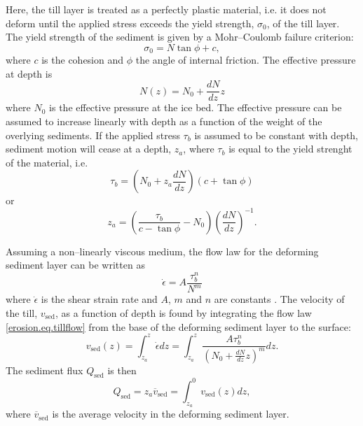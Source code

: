 Here, the till layer is treated as a perfectly plastic material, i.e. it does not deform until the applied stress exceeds the yield strength, $\sigma_0$, of the till layer. The yield strength of the sediment is given by a Mohr--Coulomb failure criterion:
\begin{equation}
  \sigma_0=N\tan\phi+c,
\end{equation}
where $c$ is the cohesion and $\phi$ the angle of internal friction. The effective pressure at depth is
\begin{equation}
  N(z)=N_0+\frac{dN}{dz}z
\end{equation}
where $N_0$ is the effective pressure at the ice bed. The effective pressure can be assumed to increase linearly with depth as a function of the weight of the overlying sediments. If the applied stress $\tau_b$ is assumed to be constant with depth, sediment motion will cease at a depth, $z_a$, where $\tau_b$ is equal to the yield strenght of the material, i.e.
\begin{equation}
  \tau_b=\left(N_0+z_a\frac{dN}{dz}\right)\left(c+\tan\phi\right)
\end{equation}
or
\begin{equation}
  \label{erosion.eq.sed_thick}
  z_a=\left(\frac{\tau_b}{c-\tan\phi}-N_0\right)\left({\frac{dN}{dz}}\right)^{-1}.
\end{equation}

Assuming a non--linearly viscous medium, the flow law for the deforming sediment layer can be written as
\begin{equation}
  \dot\epsilon=A\frac{\tau_b^n}{N^m}
  \label{erosion.eq.tillflow}
\end{equation}
where $\dot\epsilon$ is the shear strain rate and $A$, $m$ and $n$ are constants \citep{erosion.5}. The velocity of the till, $v_{\text{sed}}$, as a function of depth is found by integrating the flow law \eqref{erosion.eq.tillflow} from the base of the deforming sediment layer to the surface:
\begin{equation}
  \label{erosion.eq.tillvelo}
  v_{\text{sed}}(z)=\int_{z_a}^z\dot\epsilon dz=\int_{z_a}^z\frac{A\tau_b^n}{\left(N_0+\frac{dN}{dz}z\right)^m}dz.
\end{equation}
The sediment flux $Q_{\text{sed}}$ is then
\begin{equation}
  \label{erosion.eq.tillflux}
  Q_{\text{sed}}=z_a\overline{v}_{\text{sed}}=\int_{z_a}^0v_{\text{sed}}(z)dz,
\end{equation}
where $\overline{v}_{\text{sed}}$ is the average velocity in the deforming sediment layer.
